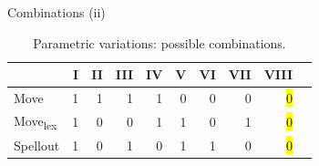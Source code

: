 \documentclass[lesson_slides]{subfiles}
\begin{document}
\begin{frame}{Combinations (ii)}

    \begin{table}[H]
        \centering
        \begin{tabular}{|l|r|r|r|r|r|r|r|r|r|}
        \hline
         & I & II & III & IV & V & VI & VII & VIII \\
        \hline
        Move                    & 1 & 1 & 1 & 1 & 0 & 0 & 0 & \hl{0} \\
        \hline
        Move\textsubscript{lex} & 1 & 0 & 0 & 1 & 1 & 0 & 1 & \hl{0} \\
        \hline
        Spellout                & 1 & 0 & 1 & 0 & 1 & 1 & 0 & \hl{0} \\
        \hline
        \end{tabular}
        \caption{\label{tab:samp}Parametric variations: possible combinations.}
    \end{table}
    
\end{frame}
\end{document}

